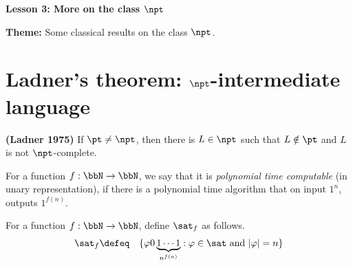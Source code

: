 \documentclass[11pt, a4paper]{article}
\renewcommand{\lesson}{3}
\renewcommand{\lessontitle}{More on the class $\npt$}
\renewcommand{\fulltitle}{Lesson \lesson: \lessontitle}
\begin{document}
\date{}



\begin{center}
{\Large {\bf \fulltitle}}
\end{center}
\vspace{0.5cm}

\noindent
{\bf Theme:} Some classical results on the class $\npt$.


\section{Ladner's theorem: $\npt$-intermediate language}
\label{sec:ladner}

\begin{theorem}
\label{theo:ladner}
{\bf (Ladner 1975)}
If $\pt\neq \npt$,
then there is $L\in \npt$ such that $L\notin \pt$
and $L$ is not $\npt$-complete. 
\end{theorem}

For a function $f:\bbN\to \bbN$,
we say that it is {\em polynomial time computable} (in unary representation),
if there is a polynomial time algorithm that on input $1^n$, outputs $1^{f(n)}$.

For a function $f:\bbN\to \bbN$,
define $\sat_f$ as follows.
\begin{eqnarray*}
\sat_f & \defeq & \{\varphi0 \underbrace{1\cdots 1}_{n^{f(n)}} : \varphi \in \sat \ \text{and}\ |\varphi|=n\}
\end{eqnarray*}
\end{document}
